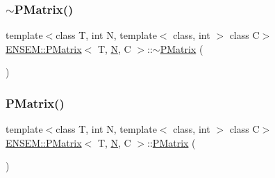 \subsubsection{\texorpdfstring{$\sim$PMatrix()}{~PMatrix()}\hspace{0.1cm}{\footnotesize\ttfamily [2/3]}}
{\footnotesize\ttfamily template$<$class T, int N, template$<$ class, int $>$ class C$>$ \\
\mbox{\hyperlink{classENSEM_1_1PMatrix}{E\+N\+S\+E\+M\+::\+P\+Matrix}}$<$ T, \mbox{\hyperlink{adat__devel_2lib_2hadron_2operator__name__util_8cc_a7722c8ecbb62d99aee7ce68b1752f337}{N}}, C $>$\+::$\sim$\mbox{\hyperlink{classENSEM_1_1PMatrix}{P\+Matrix}} (\begin{DoxyParamCaption}{ }\end{DoxyParamCaption})\hspace{0.3cm}{\ttfamily [inline]}}

\mbox{\label{classENSEM_1_1PMatrix_ae32acebccb43c577a9e4dde0866a6c78}} 
\subsubsection{\texorpdfstring{PMatrix()}{PMatrix()}\hspace{0.1cm}{\footnotesize\ttfamily [3/3]}}
{\footnotesize\ttfamily template$<$class T, int N, template$<$ class, int $>$ class C$>$ \\
\mbox{\hyperlink{classENSEM_1_1PMatrix}{E\+N\+S\+E\+M\+::\+P\+Matrix}}$<$ T, \mbox{\hyperlink{adat__devel_2lib_2hadron_2operator__name__util_8cc_a7722c8ecbb62d99aee7ce68b1752f337}{N}}, C $>$\+::\mbox{\hyperlink{classENSEM_1_1PMatrix}{P\+Matrix}} (\begin{DoxyParamCaption}{ }\end{DoxyParamCaption})\hspace{0.3cm}{\ttfamily [inline]}}

\mbox{\label{classENSEM_1_1PMatrix_a3196ba50adba3cc1e72bb29ce0b02cda}} 
